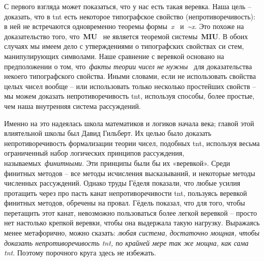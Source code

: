 \documentclass[../main.tex]{subfiles}
\begin{document}
С первого взгляда может показаться, что у нас есть такая веревка. Наша цель \--- доказать, что в \acs{tnt} есть некоторое типографское свойство (непротиворечивость): в ней не встречаются одновременно теоремы формы~\emph{x} ~и~\emph{\textasciitilde x}. Это похоже на доказательство того, что~\textbf{MU} ~не является теоремой системы~\textbf{MIU}. В обоих случаях мы имеем дело с утверждениями о типографских свойствах си стем, манипулирующих символами. Наше сравнение с веревкой основано на предположении о том, что~\emph{факты теории чисел не нужны} ~для доказательства некоего типографского свойства. Иными словами, если не использовать свойства целых чисел вообще \--- или использовать только несколько простейших свойств \--- мы можем доказать непротиворечивость \acs{tnt}, используя способы, более простые, чем наша внутренняя система рассуждений.

Именно на это надеялась школа математиков и логиков начала века; главой этой влиятельной школы был Давид Гильберт. Их целью было доказать непротиворечивость формализации теории чисел, подобных \acs{tnt}, используя весьма ограниченный набор логических принципов рассуждения, называемых~\emph{финитными}. Эти принципы были бы их «веревкой». Среди финитных методов \--- все методы исчисления высказываний, и некоторые методы численных рассуждений. Однако труды Гёделя показали, что любые усилия протащить через про пасть канат непротиворечивости \acs{tnt}, пользуясь веревкой финитных методов, обречены на провал. Гёдель показал, что для того, чтобы перетащить этот канат, невозможно пользоваться более легкой веревкой \--- просто нет настолько крепкой веревки, чтобы она выдержала такую нагрузку. Выражаясь менее метафорично, можно сказать: \emph{любая система, достаточно мощная, чтобы доказать непротиворечивость \acs{tnt}, по крайней мере так же мощна, как сама \acs{tnt}}. Поэтому порочного круга здесь не избежать.

\ifSubfilesClassLoaded{%
    \printacronyms
}{%
}
\end{document}
